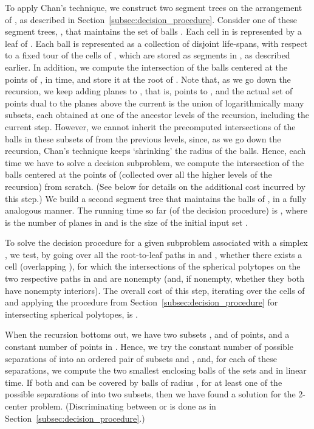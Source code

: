 \documentclass[a4paper,12pt]{article}
\begin{document}
To apply Chan's technique, we construct two segment trees on the
arrangement of , as described in Section~\ref{subsec:decision_procedure}. Consider one of these segment trees, ,
that maintains the set of balls . Each cell  in  is represented by a
leaf of . Each ball is represented as a collection of disjoint
life-spans, with respect to a fixed tour of the cells of ,
which are stored as segments in , as described earlier.
In addition, we compute the intersection of the balls centered
at the points of , in  time, and store it at
the root of . Note that, as we go down the recursion, we keep
adding planes to , that is, points to , and the
actual set  of points dual to the planes above the
current  is the union of logarithmically many subsets, each
obtained at one of the ancestor levels of the recursion, including the current step.
However, we cannot inherit the precomputed intersections of the balls
in these subsets of  from the previous levels, since, as we go down the
recursion, Chan's technique keeps `shrinking' the radius of the balls. Hence, each
time we have to solve a decision subproblem, we compute the
intersection of the balls centered at the points of 
(collected over all the higher levels of the recursion)
from scratch. (See below for details on the additional cost incurred
by this step.) We build a second segment tree 
that maintains the balls of , in a fully analogous manner. The running time so far (of the decision procedure)
is , where  is the
number of planes in  and  is the size of the
initial input set .

To solve the decision procedure for a given subproblem associated
with a simplex , we test, by going over all the
root-to-leaf paths in  and , whether there exists a cell
 (overlapping ), for which the intersections of the
spherical polytopes on the two respective paths in  and 
are nonempty (and, if nonempty, whether they both have nonempty
interiors). The overall cost of this step, iterating over the
 cells of  and applying the
procedure from Section~\ref{subsec:decision_procedure} for
intersecting spherical polytopes, is .

When the recursion bottoms out, we have two subsets
, and  of  points, and a
constant number of points in . Hence, we try the
constant number of possible separations of  into an
ordered pair of subsets  and , and, for each of these separations, we compute the two
smallest enclosing balls of the sets  and
 in linear time. If both  and  can be covered by balls of
radius , for at least one of the possible separations of
 into two subsets, then we have found a solution for
the 2-center problem. (Discriminating between  or 
is done as in Section~\ref{subsec:decision_procedure}.)
\end{document}

